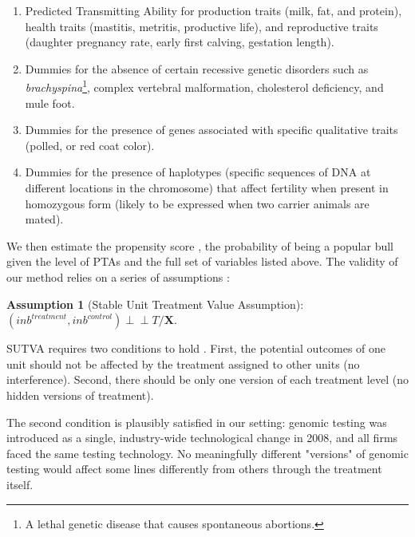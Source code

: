 \documentclass[12pt,letterpaper]{article}
\begin{document}
\begin{enumerate}
    \item Predicted Transmitting Ability for production traits (milk, fat, and protein), health traits (mastitis, metritis, productive life), and reproductive traits (daughter pregnancy rate, early first calving, gestation length).
    \item Dummies for the absence of certain recessive genetic disorders \citep{sire_workbbok2021} such as \textit{brachyspina}\footnote{A lethal genetic disease that causes spontaneous abortions.}, complex vertebral malformation, cholesterol deficiency, and mule foot.
    \item Dummies for the presence of genes associated with specific qualitative traits (polled, or red coat color).
    \item Dummies for the presence of haplotypes (specific sequences of DNA at different locations in the chromosome) that affect fertility \citep{haplotypes2018} when present in homozygous form (likely to be expressed when two carrier animals are mated).
\end{enumerate}

We then estimate the propensity score \citep[p.~873]{Cameron_Trivedi2005}, the probability of being a popular bull given the level of PTAs and the full set of variables listed above. The validity of our method relies on a series of assumptions \citep{Heckman1997}:

\medskip
\textbf{Assumption 1} (Stable Unit Treatment Value Assumption): $(inb^{treatment}, inb^{control}) \perp\!\!\!\perp T/\mathbf{X}$.

SUTVA requires two conditions to hold \citep{Imbens2015}. First, the potential outcomes of one unit should not be affected by the treatment assigned to other units (no interference). Second, there should be only one version of each treatment level (no hidden versions of treatment).

The second condition is plausibly satisfied in our setting: genomic testing was introduced as a single, industry-wide technological change in 2008, and all firms faced the same testing technology. No meaningfully different "versions" of genomic testing would affect some lines differently from others through the treatment itself.
\end{document}
